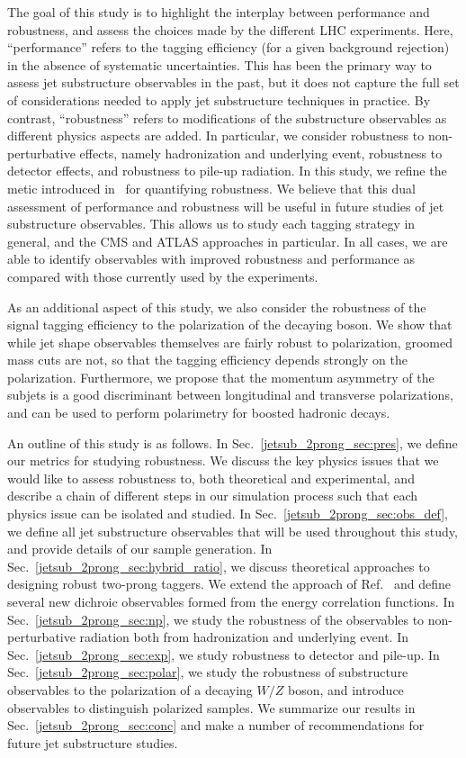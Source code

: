 \documentclass[11pt]{cernrep}
\begin{document}
The goal of this study is to highlight the interplay between performance and robustness, and assess the choices made by the different LHC experiments.
%
Here, ``performance'' refers to the tagging efficiency (for a given background rejection) in the absence of systematic uncertainties.
%
This has been the primary way to assess jet substructure observables in the past, but it does not capture the full set of considerations needed to apply jet substructure techniques in practice.
%
By contrast, ``robustness'' refers to modifications of the substructure observables as different physics aspects are added.
%
In particular, we consider robustness to non-perturbative effects, namely hadronization and underlying event, robustness to detector effects, and robustness to pile-up radiation.
%
In this study, we refine the metic introduced
in~\cite{Dasgupta:2016ktv,Salam:2016yht} for quantifying
robustness. We believe that this dual assessment of performance and
robustness will be useful in future studies of jet substructure
observables.
%
This allows us to study each tagging strategy in general, and the CMS
and ATLAS approaches in particular.
%
In all cases, we are able to identify observables with improved robustness and performance as compared with those currently used by the experiments.


As an additional aspect of this study, we also consider the robustness of the signal tagging efficiency to the polarization of the decaying boson.
%
We show that while jet shape observables themselves are fairly robust to polarization, groomed mass cuts are not, so that the tagging efficiency depends strongly on the polarization.
%
Furthermore, we propose that the momentum  asymmetry of the subjets is a good discriminant between longitudinal and transverse polarizations, and can be used to perform polarimetry for boosted hadronic decays. 

An outline of this study is as follows.
%
In Sec.~\ref{jetsub_2prong_sec:pres}, we define our metrics for studying robustness.
%
We discuss the key physics issues that we would like to assess robustness to, both theoretical and experimental, and describe a chain of different steps in our simulation process such that each physics issue can be isolated and studied.
%
In Sec.~\ref{jetsub_2prong_sec:obs_def}, we define all jet substructure observables that will be used throughout this study, and  provide details of our sample generation.
%
In Sec.~\ref{jetsub_2prong_sec:hybrid_ratio}, we discuss theoretical approaches to designing robust two-prong taggers.
%
We extend the approach of Ref.~\cite{Salam:2016yht} and define several new dichroic observables formed from the energy correlation functions.  
%
In Sec.~\ref{jetsub_2prong_sec:np}, we study the robustness of the observables to non-perturbative radiation both from hadronization and underlying event.
%
In Sec.~\ref{jetsub_2prong_sec:exp}, we study robustness to detector and pile-up.
%
In Sec.~\ref{jetsub_2prong_sec:polar}, we study the robustness of substructure observables to the polarization of a decaying $W/Z$ boson, and introduce observables to distinguish polarized samples.
%
We summarize our results in Sec.~\ref{jetsub_2prong_sec:conc} and make a number of recommendations for future jet substructure studies.
\end{document}
